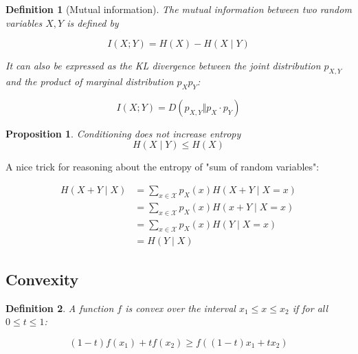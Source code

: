 \documentclass{article}
\newtheorem{definition}{Definition}[section]
\newtheorem{proposition}{Proposition}[section]
\begin{document}
    \begin{definition}[Mutual information]
        The mutual information between two random variables $X, Y$ is defined by

        \begin{equation*}
            I(X; Y) = H(X) - H(X \mid Y)
        \end{equation*}

        It can also be expressed as the KL divergence between the joint distribution $p_{X, Y}$ and the product of marginal distribution $p_Xp_Y$:

        \begin{equation*}
            I(X; Y) = D(p_{X,Y} \Vert p_X \cdot p_Y)
        \end{equation*}
    \end{definition}

    \begin{proposition}
    Conditioning does not increase entropy
        \begin{equation*}
            H(X \mid Y) \leq H(X)
        \end{equation*}
    \end{proposition}

    A nice trick for reasoning about the entropy of "sum of random variables":

    $$
    \begin{aligned}
        H(X + Y \mid X) &= \sum_{x \in \mathcal{X}}p_X(x)H(X + Y \mid X=x) \\
        &= \sum_{x \in \mathcal{X}}p_X(x)H(x + Y \mid X=x) \\
        &= \sum_{x \in \mathcal{X}}p_X(x)H(Y \mid X=x) \\
        &= H(Y \mid X)
    \end{aligned}
    $$

    \subsection{Convexity}

    \begin{definition}
        A function $f$ is convex over the interval $x_1 \leq x \leq x_2$ if for all $0 \leq t \leq 1$:

        \begin{equation*}
            (1-t)f(x_1) + tf(x_2) \geq f((1-t)x_1 + tx_2)
        \end{equation*}
    \end{definition}
\end{document}
